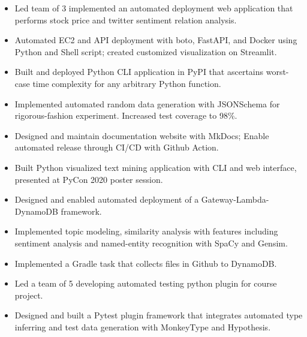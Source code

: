 \begin{itemize}
\item Led team of 3 implemented an automated deployment web application that performs stock price and twitter sentiment relation analysis.
\item Automated EC2 and API deployment with boto, FastAPI, and Docker using Python and Shell script; created customized visualization on Streamlit.
\end{itemize}
\smallskip
{}
\begin{itemize}
\item Built and deployed Python CLI application in PyPI that ascertains worst-case time complexity for any arbitrary Python function.
\item Implemented automated random data generation with JSONSchema for rigorous-fashion experiment. Increased test coverage to 98\%.
\item Designed and maintain documentation website with MkDocs; Enable automated release through CI/CD with Github Action.
\end{itemize}
\smallskip
{}
\begin{itemize}
\item Built Python visualized text mining application with CLI and web interface, presented at PyCon 2020 poster session.
\item Designed and enabled automated deployment of a Gateway-Lambda-DynamoDB framework.
\item Implemented topic modeling, similarity analysis with features including sentiment analysis and named-entity recognition with SpaCy and Gensim.
\item Implemented a Gradle task that collects files in Github to DynamoDB.
\end{itemize}
\smallskip
{}
\begin{itemize}
\item Led a team of 5 developing automated testing python plugin for course project.
\item Designed and built a Pytest plugin framework that integrates automated type inferring and test data generation with MonkeyType and Hypothesis.
\end{itemize}
\smallskip

